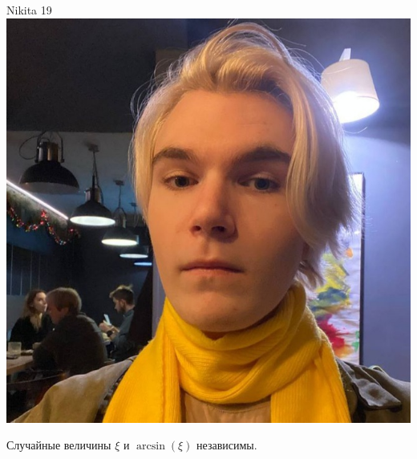 \documentclass[12pt]{article}
\begin{document}
\begin{minipage}{0.45\textwidth}
\begin{tinderm}{Nikita 19}
\includegraphics[width=\textwidth]{tinder-photo/nikita2.jpg}

  

\begin{mybox}
Случайные величины $\xi$ и $\arcsin(\xi)$ независимы.
\end{mybox}
\end{tinderm}
\end{minipage}
%
%
\end{document}
